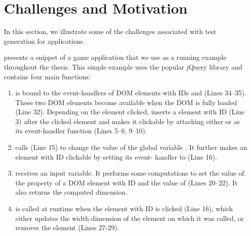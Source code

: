 \section{Challenges and Motivation} \label{Sec:motivation}

 

In this section, we illustrate some of the challenges associated with test generation for \javascript applications. 
%

 presents a snippet of a \javascript game application that we use as a running example throughout the thesis. This simple example uses the popular jQuery library \cite{jquery-api} and contains four main \javascript functions: 

\begin{enumerate} 

\item {} is bound to the event-handlers of DOM elements with IDs  and   (Lines 34--35). These two DOM elements become available when the DOM is fully loaded (Line 32). Depending on the element clicked,  inserts a  element with ID  (Line 3) after the clicked element and makes it clickable by attaching either  or  as its event-handler function (Lines 5--6, 9--10).    

\item {} calls  (Line 15) to change the value of the global variable . It further makes an element with ID  clickable by setting its event- handler to  (Line 16).

\item {} receives an input variable. It performs some computations to set the  value of the  property of a DOM element with ID   and the value of  (Lines 20--22). It also returns the computed dimension.

\item {} is called at runtime when the element with ID  is clicked (Line 16), which either updates the width dimension of the element on which it was called, or removes the element (Lines 27-29).
\end{enumerate}

